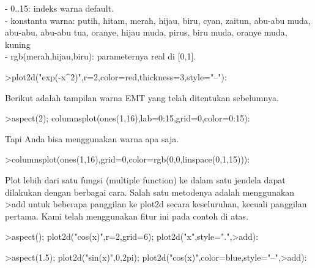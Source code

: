 \documentclass[a4paper,10pt]{article}
\begin{document}
\begin{eulernotebook}
\begin{eulercomment}
\begin{eulercomment}
\begin{eulercomment}
\begin{eulercomment}
\begin{eulercomment}
- 0..15: indeks warna default.\\
- konstanta warna: putih, hitam, merah, hijau, biru, cyan, zaitun,
abu-abu muda, abu-abu, abu-abu tua, oranye, hijau muda, pirus, biru
muda, oranye muda, kuning\\
- rgb(merah,hijau,biru): parameternya real di [0,1].
\end{eulercomment}
\begin{eulerprompt}
>plot2d("exp(-x^2)",r=2,color=red,thickness=3,style="--"):
\end{eulerprompt}
\begin{eulercomment}
Berikut adalah tampilan warna EMT yang telah ditentukan sebelumnya.
\end{eulercomment}
\begin{eulerprompt}
>aspect(2); columnsplot(ones(1,16),lab=0:15,grid=0,color=0:15):
\end{eulerprompt}
\begin{eulercomment}
Tapi Anda bisa menggunakan warna apa saja.
\end{eulercomment}
\begin{eulerprompt}
>columnsplot(ones(1,16),grid=0,color=rgb(0,0,linspace(0,1,15))):
\end{eulerprompt}
\begin{eulercomment}
Plot lebih dari satu fungsi (multiple function) ke dalam satu jendela
dapat dilakukan dengan berbagai cara. Salah satu metodenya adalah
menggunakan \textgreater{}add untuk beberapa panggilan ke plot2d secara
keseluruhan, kecuali panggilan pertama. Kami telah menggunakan fitur
ini pada contoh di atas.
\end{eulercomment}
\begin{eulerprompt}
>aspect(); plot2d("cos(x)",r=2,grid=6); plot2d("x",style=".",>add):
\end{eulerprompt}
\begin{eulerprompt}
>aspect(1.5); plot2d("sin(x)",0,2pi); plot2d("cos(x)",color=blue,style="--",>add):
\end{eulerprompt}
\begin{eulercomment}

\end{eulercomment}
\end{eulercomment}
\end{eulercomment}
\end{eulercomment}
\end{eulercomment}
\end{eulernotebook}
\end{document}
